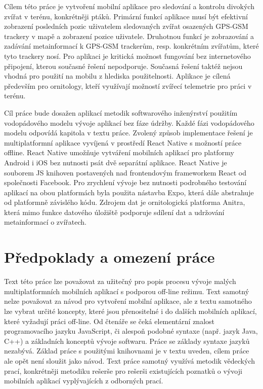 Cílem této práce je vytvoření mobilní aplikace pro sledování a kontrolu divokých zvířat v terénu, konkrétněji ptáků. Primární funkcí aplikace musí být efektivní zobrazení posledních pozic uživatelem sledovaných zvířat osazených GPS-GSM trackery v mapě a zobrazení pozice uživatele. Druhotnou funkcí je zobrazování a zadávání metainformací k GPS-GSM trackerům, resp. konkrétním zvířatům, které tyto trackery nosí. Pro aplikaci je kritická možnost fungování bez internetového připojení, kterou současné řešení nepodporuje. Současná řešení taktéž nejsou vhodná pro použití na mobilu z hlediska použitelnosti. Aplikace je cílená především pro ornitology, kteří využívají možností zvířecí telemetrie pro práci v terénu.

Cíl práce bude dosažen aplikací metodik softwarového inženýrství použitím vodopádového modelu vývoje aplikací bez fáze údržby. Každé fázi vodopádového modelu odpovídá kapitola v textu práce. Zvolený způsob implementace řešení je multiplatformní aplikace vyvíjená v prostředí React Native s možností práce offline. React Native umožňuje vytváření mobilních aplikací pro platformy Android i iOS bez nutnosti psát dvě separátní aplikace. React Native je souborem JS knihoven postavených nad frontendovým frameworkem React od společnosti Facebook. Pro zrychlení vývoje bez nutnosti podrobného testování aplikací na obou platformách byla použita nástavba Expo, která dále abstrahuje od platformně závislého kódu. Zdrojem dat je ornitologická platforma Anitra, která mimo funkce datového úložiště podporuje sdílení dat a udržování metainformací o zvířatech.

\section*{Předpoklady a omezení práce}
Text této práce lze považovat za užitečný pro popis procesu vývoje malých multiplatformních mobilních aplikací s podporou off-line režimu. Text samotný nelze považovat za návod pro vytvoření mobilní aplikace, ale z textu samotného lze vybrat určité koncepty, které jsou přenositelné i do dalších mobilních aplikací, které vyžadují práci off-line. Od čtenáře se čeká elementární znalost programovacího jazyku JavaScript, či alespoň podobné syntaxe (např. jazyk Java, C++) a základních konceptů vývoje softwaru. Práce se základy syntaxe jazyků nezabývá. Základ práce s použitými knihovnami je v textu uveden, cílem práce ale opět není sloužit jako návod.  Text práce samotný využívá metodik vědeckých prací, konkrétněji metodiku rešerše pro rešerši existujících poznatků o vývoji mobilních aplikací vyplývajících z odborných prací. 

